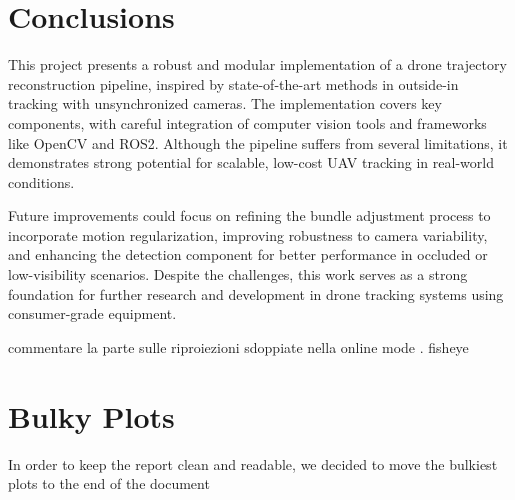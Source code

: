 \documentclass[11pt]{article}
\begin{document}
\section{Conclusions}

This project presents a robust and modular implementation of a drone trajectory reconstruction pipeline, inspired by state-of-the-art methods in outside-in tracking with unsynchronized cameras. The implementation covers key components, with careful integration of computer vision tools and frameworks like OpenCV and ROS2. Although the pipeline suffers from several limitations, it demonstrates strong potential for scalable, low-cost UAV tracking in real-world conditions.

Future improvements could focus on refining the bundle adjustment process to incorporate motion regularization, improving robustness to camera variability, and enhancing the detection component for better performance in occluded or low-visibility scenarios. Despite the challenges, this work serves as a strong foundation for further research and development in drone tracking systems using consumer-grade equipment.

{\color{red} commentare la parte sulle riproiezioni sdoppiate nella online mode . fisheye}

\section*{Bulky Plots}

In order to keep the report clean and readable, we decided to move the bulkiest plots to the end of the document
\end{document}
